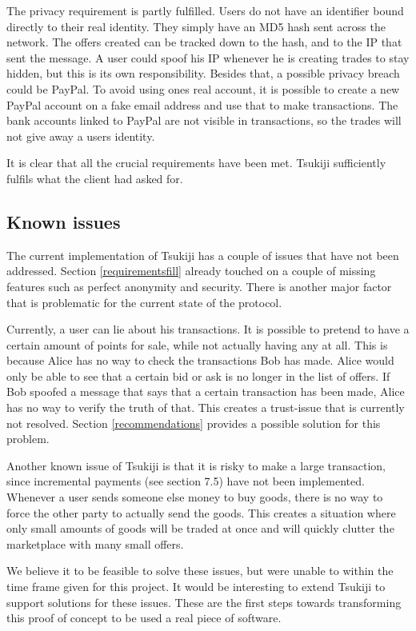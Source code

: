 The privacy requirement is partly fulfilled.
Users do not have an identifier bound directly to their real identity.
They simply have an MD5 hash sent across the network.
The offers created can be tracked down to the hash, and to the IP that sent the message.
A user could spoof his IP whenever he is creating trades to stay hidden, but this is its own responsibility.
Besides that, a possible privacy breach could be PayPal.
To avoid using ones real account, it is possible to create a new PayPal account on a fake email address and use that to make transactions.
The bank accounts linked to PayPal are not visible in transactions, so the trades will not give away a users identity.

It is clear that all the crucial requirements have been met.
Tsukiji sufficiently fulfils what the client had asked for.

\subsection{Known issues}
\label{knownissues}
The current implementation of Tsukiji has a couple of issues that have not been addressed.
Section \ref{requirementsfill} already touched on a couple of missing features such as perfect anonymity and security.
There is another major factor that is problematic for the current state of the protocol.

Currently, a user can lie about his transactions.
It is possible to pretend to have a certain amount of points for sale, while not actually having any at all.
This is because Alice has no way to check the transactions Bob has made.
Alice would only be able to see that a certain bid or ask is no longer in the list of offers.
If Bob spoofed a message that says that a certain transaction has been made, Alice has no way to verify the truth of that.
This creates a trust-issue that is currently not resolved.
Section \ref{recommendations} provides a possible solution for this problem.

Another known issue of Tsukiji is that it is risky to make a large transaction, since incremental payments (see section 7.5) have not been implemented.
Whenever a user sends someone else money to buy goods, there is no way to force the other party to actually send the goods.
This creates a situation where only small amounts of goods will be traded at once and will quickly clutter the marketplace with many small offers.

We believe it to be feasible to solve these issues, but were unable to within the time frame given for this project.
It would be interesting to extend Tsukiji to support solutions for these issues.
These are the first steps towards transforming this proof of concept to be used a real piece of software.

